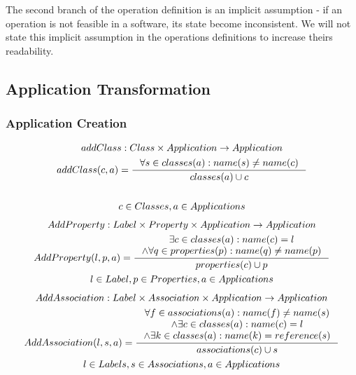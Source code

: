 \documentclass[11pt]{article}
\begin{document}
The second branch of the operation definition is an implicit assumption - if an operation is not feasible in a software, its state become inconsistent. We will not state this implicit assumption in the operations definitions to increase theirs readability.


\subsection{Application Transformation}
\subsubsection{Application Creation}
\begin{gather*}
addClass: Class \times Application \rightarrow Application \\ 
addClass(c, a) = \inference{\forall s \in classes(a) : name(s) \neq name(c)}{classes(a) \cup c} \\ \\
c \in Classes, a \in Applications
\end{gather*}
\begin{gather*}
AddProperty : Label \times Property \times Application \rightarrow Application \\
AddProperty(l, p, a) = \inference{\exists c \in classes(a) : name(c) = l \\ \wedge \forall q \in  properties(p) : name(q) \neq name(p)}{properties(c) \cup p } \\
l \in Label, p \in Properties, a \in Applications
\end{gather*}
\begin{gather*}
AddAssociation : Label \times Association \times Application \rightarrow Application \\
AddAssociation(l, s, a) = \inference{\forall f \in associations(a) : name(f) \neq name(s) \\ \wedge \exists c \in classes(a) : name(c) = l \\ \wedge \exists k \in classes(a) : name(k) = reference(s) }{associations(c) \cup s}\\
l \in Labels, s \in Associations, a \in Applications
\end{gather*}
\end{document}
